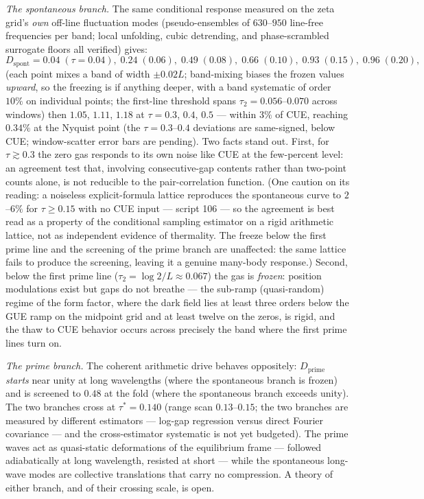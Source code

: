 \documentclass[12pt]{amsart}
\begin{document}
\emph{The spontaneous branch.} The same conditional response measured
on the zeta grid's \emph{own} off-line fluctuation modes (pseudo-ensembles
of $630$--$950$ line-free frequencies per band; local unfolding, cubic
detrending, and phase-scrambled surrogate floors all verified) gives:
\[
D_{\mathrm{spont}} = 0.04\;(\tau{=}0.04),\; 0.24\;(0.06),\;
0.49\;(0.08),\; 0.66\;(0.10),\; 0.93\;(0.15),\; 0.96\;(0.20),
\]
(each point mixes a band of width $\pm 0.02L$; band-mixing biases the
frozen values \emph{upward}, so the freezing is if anything deeper,
with a band systematic of order $10\%$ on individual points; the
first-line threshold spans $\tau_2 = 0.056$--$0.070$ across windows)
then $1.05$, $1.11$, $1.18$ at $\tau = 0.3$, $0.4$, $0.5$ --- within
$3\%$ of CUE, reaching $0.34\%$ at the Nyquist point (the
$\tau = 0.3$--$0.4$ deviations are same-signed, below CUE; window-scatter
error bars are pending). Two facts stand out. First, for
$\tau \gtrsim 0.3$ the zero gas responds to its own noise like CUE at
the few-percent level: an agreement test that, involving
consecutive-gap contents rather than two-point counts alone, is not
reducible to the pair-correlation function. (One caution on its
reading: a noiseless explicit-formula lattice reproduces the
spontaneous curve to $2$--$6\%$ for $\tau \geq 0.15$ with no CUE input
--- script 106 --- so the agreement is best read as a property of the
conditional sampling estimator on a rigid arithmetic lattice, not as
independent evidence of thermality. The freeze below the first prime
line and the screening of the prime branch are unaffected: the same
lattice fails to produce the screening, leaving it a genuine
many-body response.) Second, below the first prime line
($\tau_2 = \log 2/L \approx 0.067$) the gas is \emph{frozen}: position
modulations exist but gaps do not breathe --- the sub-ramp
(quasi-random) regime of the form factor, where the dark field lies at
least three orders below the GUE ramp on the midpoint grid and at least
twelve on the zeros, is rigid, and the thaw to CUE behavior
occurs across precisely the band where the first prime lines turn on.

\emph{The prime branch.} The coherent arithmetic drive behaves
oppositely: $D_{\mathrm{prime}}$ \emph{starts} near unity at long
wavelengths (where the spontaneous branch is frozen) and is screened to
$0.48$ at the fold (where the spontaneous branch exceeds unity). The
two branches cross at $\tau^* = 0.140$ (range scan $0.13$--$0.15$; the
two branches are measured by different estimators --- log-gap
regression versus direct Fourier covariance --- and the
cross-estimator systematic is not yet budgeted). The prime waves act as
quasi-static deformations of the equilibrium frame --- followed
adiabatically at long wavelength, resisted at short --- while the
spontaneous long-wave modes are collective translations that carry no
compression. A theory of either branch, and of their crossing scale, is
open.
\end{document}
